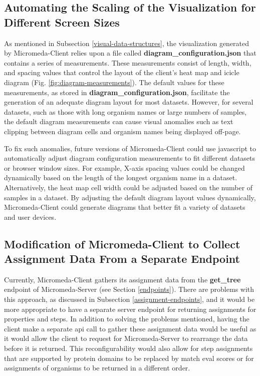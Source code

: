 \subsection{Automating the Scaling of the Visualization for Different Screen 
Sizes}

As mentioned in Subsection \ref{visual-data-structures}, the visualization 
generated by Micromeda-Client relies upon a file called 
\textbf{diagram\_configuration.json} that contains a series of measurements. 
These measurements consist of length, width, and spacing values that control the 
layout of the client's heat map and icicle diagram (Fig. 
\ref{fig:diagram-measurements}). The default values for these measurements, as 
stored in \textbf{diagram\_configuration.json}, facilitate the generation of an 
adequate diagram layout for most datasets. However, for several datasets, such 
as those with long organism names or large numbers of samples, the default 
diagram measurements can cause visual anomalies such as text clipping between 
diagram cells and organism names being displayed off-page.

To fix such anomalies, future versions of Micromeda-Client could use 
\gls{javascript} to automatically adjust diagram configuration measurements to 
fit different datasets or browser window sizes. For example, X-axis 
spacing values could be changed dynamically based on the length of the longest 
organism name in a dataset. Alternatively, the heat map cell width could be 
adjusted based on the number of samples in a dataset. By adjusting the default 
diagram layout values dynamically, Micromeda-Client could generate diagrams that 
better fit a variety of datasets and user devices.

\subsection{Modification of Micromeda-Client to Collect Assignment Data From a 
Separate Endpoint}

Currently, Micromeda-Client gathers its assignment data from the 
\textbf{get\_tree} endpoint of Micromeda-Server (see Section \ref{endpoints}). 
There are problems with this approach, as discussed in Subsection 
\ref{assignment-endpoints}, and it would be more appropriate to have a separate 
server endpoint for returning assignments for properties and steps. In addition 
to solving the problems mentioned, having the client make a separate \gls{api} 
call to gather these assignment data would be useful as it would allow the client 
to request for Micromeda-Server to rearrange the data before it is returned. 
This reconfigurability would also allow for step assignments that are supported 
by protein domains to be replaced by match \gls{eval} scores or for assignments 
of organisms to be returned in a different order.

